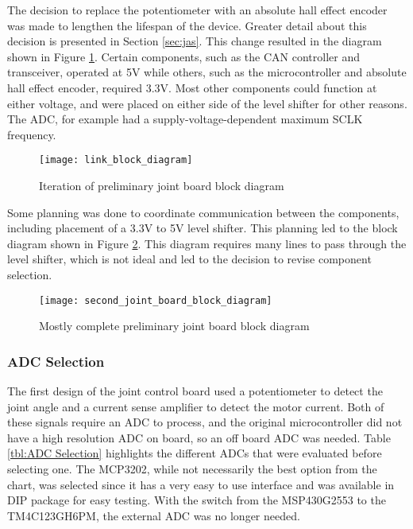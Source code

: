 \noindent The decision to replace the potentiometer with an absolute hall effect encoder was made to lengthen the lifespan of the device. Greater detail about this decision is presented in Section \ref{sec:jas}. This change resulted in the diagram shown in Figure \ref{fig:nice_prelim_joint_board_block}. Certain components, such as the CAN controller and transceiver, operated at 5V while others, such as the microcontroller and absolute hall effect encoder, required 3.3V. Most other components could function at either voltage, and were placed on either side of the level shifter for other reasons. The ADC, for example had a supply-voltage-dependent maximum SCLK frequency.
\begin{figure}[H]
	\centering
	\texttt{[image: link\_block\_diagram]}
	\caption{Iteration of preliminary joint board block diagram}
	\label{fig:nice_prelim_joint_board_block}
\end{figure}

\noindent Some planning was done to coordinate communication between the components, including placement of a 3.3V to 5V level shifter. This planning led to the block diagram shown in Figure \ref{fig:2nd_joint_board_block}. This diagram requires many lines to pass through the level shifter, which is not ideal and led to the decision to revise component selection.

\begin{figure}[H]
	\centering
	\texttt{[image: second\_joint\_board\_block\_diagram]}
	\caption{Mostly complete preliminary joint board block diagram}
	\label{fig:2nd_joint_board_block}
\end{figure}

\subsubsection{ADC Selection}
The first design of the joint control board used a potentiometer to detect the joint angle and a current sense amplifier to detect the motor current. Both of these signals require an ADC to process, and the original microcontroller did not have a high resolution ADC on board, so an off board ADC was needed. Table \ref{tbl:ADC Selection} highlights the different ADCs that were evaluated before selecting one. The MCP3202, while not necessarily the best option from the chart, was selected since it has a very easy to use interface and was available in DIP package for easy testing. With the switch from the MSP430G2553 to the TM4C123GH6PM, the external ADC was no longer needed.

